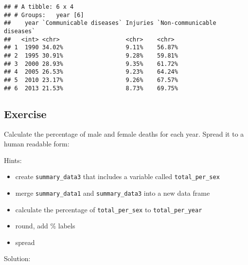 \documentclass[]{book}
\makeatletter
\newenvironment{Shaded}{\begin{snugshade}}{\end{snugshade}}
\newcommand{\KeywordTok}[1]{\textcolor[rgb]{0.13,0.29,0.53}{\textbf{#1}}}
\newcommand{\DataTypeTok}[1]{\textcolor[rgb]{0.13,0.29,0.53}{#1}}
\newcommand{\StringTok}[1]{\textcolor[rgb]{0.31,0.60,0.02}{#1}}
\newcommand{\OperatorTok}[1]{\textcolor[rgb]{0.81,0.36,0.00}{\textbf{#1}}}
\newcommand{\NormalTok}[1]{#1}
\providecommand{\tightlist}{%
  \setlength{\itemsep}{0pt}\setlength{\parskip}{0pt}}
\newenvironment{kframe}{%
\medskip{}
\setlength{\fboxsep}{.8em}
 \def\at@end@of@kframe{}%
 \ifinner\ifhmode%
  \def\at@end@of@kframe{\end{minipage}}%
  \begin{minipage}{\columnwidth}%
 \fi\fi%
 \def\FrameCommand##1{\hskip\@totalleftmargin \hskip-\fboxsep
 \colorbox{shadecolor}{##1}\hskip-\fboxsep
     \hskip-\linewidth \hskip-\@totalleftmargin \hskip\columnwidth}%
 \MakeFramed {\advance\hsize-\width
   \@totalleftmargin\z@ \linewidth\hsize
   \@setminipage}}%
 {\par\unskip\endMakeFramed%
 \at@end@of@kframe}
\renewenvironment{Shaded}{\begin{kframe}}{\end{kframe}}
\theoremstyle{definition}
\theoremstyle{definition}
\theoremstyle{definition}
\theoremstyle{remark}
\makeatother
\begin{document}
\begin{verbatim}
## # A tibble: 6 x 4
## # Groups:   year [6]
##    year `Communicable diseases` Injuries `Non-communicable diseases`
##   <int> <chr>                   <chr>    <chr>                      
## 1  1990 34.02%                  9.11%    56.87%                     
## 2  1995 30.91%                  9.28%    59.81%                     
## 3  2000 28.93%                  9.35%    61.72%                     
## 4  2005 26.53%                  9.23%    64.24%                     
## 5  2010 23.17%                  9.26%    67.57%                     
## 6  2013 21.53%                  8.73%    69.75%
\end{verbatim}

\subsection{Exercise}\label{exercise-19}

Calculate the percentage of male and female deaths for each year. Spread
it to a human readable form:

Hints:

\begin{itemize}
\tightlist
\item
  create \texttt{summary\_data3} that includes a variable called
  \texttt{total\_per\_sex}
\item
  merge \texttt{summary\_data1} and \texttt{summary\_data3} into a new
  data frame
\item
  calculate the percentage of \texttt{total\_per\_sex} to
  \texttt{total\_per\_year}
\item
  round, add \% labels
\item
  spread
\end{itemize}

Solution:

\begin{Shaded}
\end{Shaded}
\end{document}
